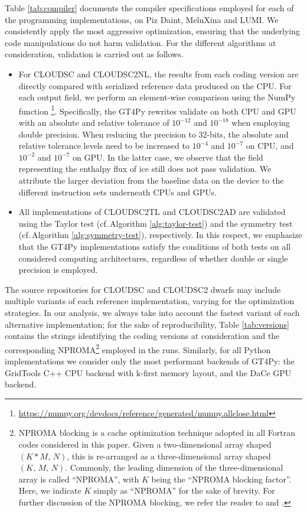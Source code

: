 \documentclass[gmd,manuscript,online]{copernicus}
\begin{document}
	\noindent Table \ref{tab:compiler} documents the compiler specifications employed for each of the programming implementations, on Piz Daint, MeluXina and LUMI. We consistently apply the most aggressive optimization, ensuring that the underlying code manipulations do not harm validation. For the different algorithms at consideration, validation is carried out as follows.
	\begin{itemize}
		\item For CLOUDSC and CLOUDSC2NL, the results from each coding version are directly compared with serialized reference data produced on the CPU. For each output field, we perform an element-wise comparison using the NumPy function \footnote{\url{https://numpy.org/devdocs/reference/generated/numpy.allclose.html}}. Specifically, the GT4Py rewrites validate on both CPU and GPU with an absolute and relative tolerance of $10^{-12}$ and $10^{-18}$ when employing double precision. When reducing the precision to 32-bits, the absolute and relative tolerance levels need to be increased to $10^{-4}$ and $10^{-7}$ on CPU, and $10^{-2}$ and $10^{-7}$ on GPU. In the latter case, we observe that the field representing the enthalpy flux of ice still does not pass validation. We attribute the larger deviation from the baseline data on the device to the different instruction sets underneath CPUs and GPUs.
		\item All implementations of CLOUDSC2TL and CLOUDSC2AD are validated using the Taylor test (cf.\,Algorithm \ref{alg:taylor-test}) and the symmetry test (cf.\,Algorithm \ref{alg:symmetry-test}), respectively. In this respect, we emphasize that the GT4Py implementations satisfy the conditions of both tests on all considered computing architectures, regardless of whether double or single precision is employed.
	\end{itemize}
	\noindent The source repositories for CLOUDSC and CLOUDSC2 dwarfs may include multiple variants of each reference implementation, varying for the optimization strategies. In our analysis, we always take into account the fastest variant of each alternative implementation; for the sake of reproducibility, Table \ref{tab:versions} contains the strings identifying the coding versions at consideration and the corresponding NPROMA\footnote{NPROMA blocking is a cache optimization technique adopted in all Fortran codes considered in this paper. Given a two-dimensional array shaped $(K * M, \, N)$, this is re-arranged as a three-dimensional array shaped $(K, \, M, \, N)$. Commonly, the leading dimension of the three-dimensional array is called ``NPROMA'', with $K$ being the ``NPROMA blocking factor''. Here, we indicate $K$ simply as ``NPROMA'' for the sake of brevity. For further discussion of the NPROMA blocking, we refer the reader to \citet{muller19} and \citet{bauer20}.} employed in the runs. Similarly, for all Python implementations we consider only the most performant backends of GT4Py: the GridTools C++ CPU backend with k-first memory layout, and the DaCe GPU backend.
\end{document}
